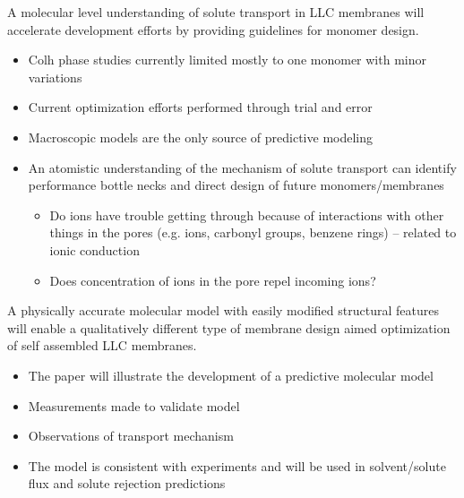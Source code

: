 \documentclass{article}
\begin{document}
	A molecular level understanding of solute transport in LLC membranes will accelerate development efforts by providing guidelines for monomer design.
	\begin{itemize}
		\item Colh phase studies currently limited mostly to one monomer with minor variations
		\item Current optimization efforts performed through trial and error
		\item Macroscopic models are the only source of predictive modeling
		\item An atomistic understanding of the mechanism of solute transport can identify
		performance bottle necks and direct design of future monomers/membranes
		\begin{itemize}
			\item Do ions have trouble getting through because of interactions with other things in the pores (e.g. ions, carbonyl groups, benzene rings) -- related to ionic conduction
			\item Does concentration of ions in the pore repel incoming ions?
		\end{itemize}
	\end{itemize}
	A physically accurate molecular model with easily modified structural features will enable a qualitatively different type of membrane design aimed optimization of self assembled LLC membranes.
	\begin{itemize}
		\item The paper will illustrate the development of a predictive molecular model
		\item Measurements made to validate model
		\item Observations of transport mechanism
		\item The model is consistent with experiments and will be used in solvent/solute flux and solute rejection predictions
	\end{itemize}
	
\end{document}

